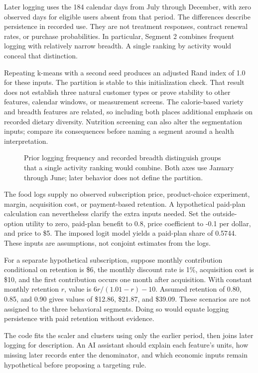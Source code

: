 Later logging uses the 184 calendar days from July through December,
with zero observed days for eligible users absent from that period. The
differences describe persistence in recorded use. They are not treatment
responses, contract renewal rates, or purchase probabilities. In
particular, Segment 2 combines frequent logging with relatively narrow
breadth. A single ranking by activity would conceal that distinction.

Repeating k-means with a second seed produces an adjusted Rand index of
1.0 for these inputs. The partition is stable to this initialization
check. That result does not establish three natural customer types or
prove stability to other features, calendar windows, or measurement
screens. The calorie-based variety and breadth features are related, so
including both places additional emphasis on recorded dietary diversity.
Nutrition screening can also alter the segmentation inputs; compare its
consequences before naming a segment around a health interpretation.

\begin{figure}[htbp]
\centering

\caption{Prior logging frequency and recorded breadth distinguish groups that a single activity ranking would combine. Both axes use January through June; later behavior does not define the partition.}\label{fig:M04_mhealth_segments}
\end{figure}

The food logs supply no observed subscription price, product-choice
experiment, margin, acquisition cost, or payment-based retention. A
hypothetical paid-plan calculation can nevertheless clarify the extra
inputs needed. Set the outside-option utility to zero, paid-plan benefit
to 0.8, price coefficient to -0.1 per dollar, and price to \$5. The
imposed logit model yields a paid-plan share of 0.5744. These inputs are
assumptions, not conjoint estimates from the logs.

For a separate hypothetical subscription, suppose monthly contribution
conditional on retention is \$6, the monthly discount rate is 1\%,
acquisition cost is \$10, and the first contribution occurs one month
after acquisition. With constant monthly retention \(r\), value is
\(6r/(1.01-r)-10\). Assumed retention of 0.80, 0.85, and 0.90 gives
values of \$12.86, \$21.87, and \$39.09. These scenarios are not
assigned to the three behavioral segments. Doing so would equate logging
persistence with paid retention without evidence.

The code fits the scaler and clusters using only the earlier period,
then joins later logging for description. An AI assistant should explain
each feature's units, how missing later records enter the denominator,
and which economic inputs remain hypothetical before proposing a
targeting rule.

